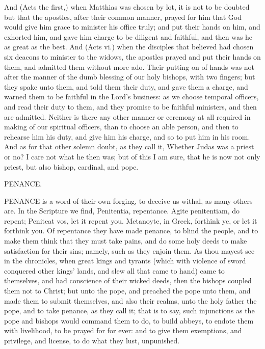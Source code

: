 And (Acts the first,) when Matthias was chosen by lot, 
it is not to be doubted but that the apostles, after their 
common manner, prayed for him that God would give him 
grace to minister his office truly; and put their hands on 
him, and exhorted him, and gave him charge to be diligent
and faithful, and then was he as great as the best. 
And (Acts vi.) when the disciples that believed had chosen 
six deacons to minister to the widows, the apostles prayed 
and put their hands on them, and admitted them without 
more ado. Their putting on of hands was not after the 
manner of the dumb blessing of our holy bishops, with 
two fingers; but they spake unto them, and told them their 
duty, and gave them a charge, and warned them to be 
faithful in the Lord's business: as we choose temporal 
officers, and read their duty to them, and they promise to 
be faithful ministers, and then are admitted. Neither is 
there any other manner or ceremony at all required in 
making of our spiritual officers, than to choose an able 
person, and then to rehearse him his duty, and give him 
his charge, and so to put him in his room. And as for 
that other solemn doubt, as they call it, Whether Judas 
was a priest or no? I care not what he then was; but of
this I am sure, that he is now not only priest, but also
bishop, cardinal, and pope. 


PENANCE. 

PENANCE is a word of their own forging, to deceive 
us withal, as many others are. In the Scripture 
we find, Penitentia, repentance. Agite penitentiam, do 
repent; Peniteat vos, let it repent you. Metanoyte, in 
Greek, forthink ye, or let it forthink you. Of repentance
they have made penance, to blind the people,
and to make them think that they must take pains, 
and do some holy deeds to make satisfaction for their 
sins; namely, such as they enjoin them. As thou mayest 
see in the chronicles, when great kings and tyrants 
(which with violence of sword conquered other kings' 
lands, and slew all that came to hand) came to themselves,
and had conscience of their wicked deeds, then the 
bishops coupled them not to Christ; but unto the pope, 
and preached the pope unto them, and made them to 
submit themselves, and also their realms, unto the holy 
father the pope, and to take penance, as they call it; 
that is to say, such injunctions as the pope and bishops 
would command them to do, to build abbeys, to endote 
them with livelihood, to be prayed for for ever: and to 
give them exemptions, and privilege, and license, to do 
what they lust, unpunished. 

